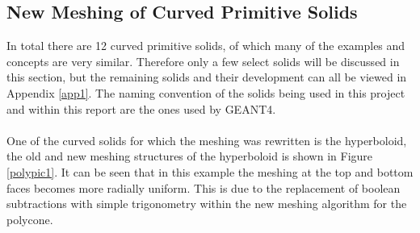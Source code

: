 \documentclass[12pt,a4paper]{article}
\begin{document}
\subsection{New Meshing of Curved Primitive Solids}
In total there are 12 curved primitive solids, of which many of the examples and concepts are very similar. Therefore only a few select solids will be discussed in this section, but the remaining solids and their development can all be viewed in Appendix \ref{app1}. The naming convention of the solids being used in this project and within this report are the ones used by GEANT4.
\\\\
One of the curved solids for which the meshing was rewritten is the hyperboloid, the old and new meshing structures of the hyperboloid is shown in Figure \ref{polypic1}. It can be seen that in this example the meshing at the top and bottom faces becomes more radially uniform. This is due to the replacement of boolean subtractions with simple trigonometry within the new meshing algorithm for the polycone.
\\\\
\end{document}
